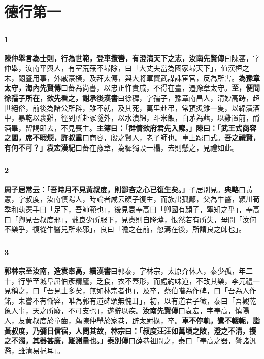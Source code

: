 \chapter{德行第一}

\subsection*{1}

\textbf{陳仲舉言為士則，行為世範，登車攬轡，有澄清天下之志，}{\footnotesize \textbf{汝南先賢傳}曰陳蕃，字仲舉，汝南平輿人，有室荒蕪不埽除，曰「大丈夫當為國家埽天下」，值漢桓之末，閹豎用事，外戚豪橫，及拜太傅，與大將軍竇武謀誅宦官，反為所害。}\textbf{為豫章太守，}{\footnotesize \textbf{海內先賢傳}曰蕃為尚書，以忠正忤貴戚，不得在臺，遷豫章太守。}\textbf{至，便問徐孺子所在，欲先看之，}{\footnotesize \textbf{謝承後漢書}曰徐穉，字孺子，豫章南昌人，清妙高跱，超世絕俗，前後為諸公所辟，雖不就，及其死，萬里赴弔，常預炙雞一隻，以綿漬酒中，暴乾以裹雞，徑到所赴冢隧外，以水漬綿，斗米飯，白茅為藉，以雞置前，酹酒畢，留謁即去，不見喪主。}\textbf{主簿曰：「群情欲府君先入廨。」陳曰：「武王式商容之閭，席不暇煗，}{\footnotesize \textbf{許叔重}曰商容，殷之賢人，老子師也。車上跽曰式。}\textbf{吾之禮賢，有何不可？」}{\footnotesize \textbf{袁宏漢紀}曰蕃在豫章，為穉獨設一榻，去則懸之，見禮如此。}

\subsection*{2}

\textbf{周子居常云：「吾時月不見黃叔度，則鄙吝之心已復生矣。」}{\footnotesize 子居別見。\textbf{典略}曰黃憲，字叔度，汝南慎陽人，時論者咸云顔子復生，而族出孤鄙，父為牛醫，潁川荀季和執憲手曰「足下，吾師範也」，後見袁奉高曰「卿國有顔子，寧知之乎」，奉高曰「卿見吾叔度邪」，戴良少所服下，見憲則自降薄，悵然若有所失，母問「汝何不樂乎，復從牛醫兒所來邪」，良曰「瞻之在前，忽焉在後，所謂良之師也」。}

\subsection*{3}

\textbf{郭林宗至汝南，造袁奉高，}{\footnotesize \textbf{續漢書}曰郭泰，字林宗，太原介休人，泰少孤，年二十，行學至城阜屈伯彥精廬，乏食，衣不蓋形，而處約味道，不改其樂，李元禮一見稱之，曰「吾見士多矣，無如林宗者也」，及卒，蔡伯喈為作碑，曰「吾為人作銘，未嘗不有慚容，唯為郭有道碑頌無愧耳」，初，以有道君子徵，泰曰「吾觀乾象人事，天之所廢，不可支也」，遂辭以疾。\textbf{汝南先賢傳}曰袁宏，字奉高，慎陽人，友黄叔度於童齒，薦陳仲舉於家巷，辟太尉掾，卒。}\textbf{車不停軌，鸞不輟軛，詣黃叔度，乃彌日信宿，人問其故，林宗曰：「叔度汪汪如萬頃之陂，澄之不清，擾之不濁，其器甚廣，難測量也。」}{\footnotesize \textbf{泰別傳}曰薛恭祖問之，泰曰「奉高之器，譬諸汎濫，雖清易挹耳」。}

